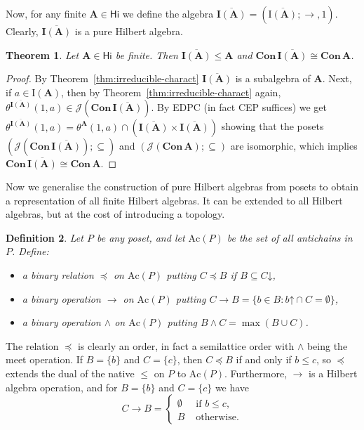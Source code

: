 \documentclass{amsart}
\newtheorem{theorem}{Theorem}[section]
\newtheorem{defn}[theorem]{Definition}
\newcommand{\alg}[1]{\mathbf{#1}}
\newcommand{\var}[1]{\mathsf{#1}}
\newcommand{\ov}[1]{\overline{#1}}
\newcommand{\Con}[1]{\mathbf{Con}\, #1}
\newcommand{\J}[1]{\mathcal{J}(#1)}
\newcommand{\Irr}[1]{\mathbf{I}(#1)}
\newcommand{\irr}[1]{\mathrm{I}(#1)}
\def\ra{\rightarrow}
\def\up#1{{#1}\mathord{\uparrow}}
\def\dw#1{{#1}\mathord{\downarrow}}
\begin{document}
Now, for any finite $\alg{A}\in\var{Hi}$ we define the algebra
$\ov{\Irr{\alg{A}}} = (\ov{\irr{\alg{A}}}; \ra, 1)$. Clearly,
$\ov{\Irr{\alg{A}}}$ is a pure Hilbert algebra. 

\begin{theorem}\label{thm:repr-fin-Hi}
Let $\alg{A}\in\var{Hi}$ be finite. Then $\ov{\Irr{\alg{A}}}\leq \alg{A}$ and
$\Con{\ov{\Irr{\alg{A}}}} \cong \Con{\alg{A}}$. 
\end{theorem}

\begin{proof}
By Theorem~\ref{thm:irreducible-charact} $\ov{\Irr{\alg{A}}}$ is a 
subalgebra of $\alg{A}$. Next, if $a\in\irr{\alg{A}}$, then by 
Theorem~\ref{thm:irreducible-charact} again, 
$\theta^{\ov{\Irr{\alg{A}}}}(1,a) \in \J{\Con{\ov{\Irr{\alg{A}}}}}$. By EDPC
(in fact CEP suffices) we get $\theta^{\ov{\Irr{\alg{A}}}}(1,a) =
\theta^{\alg{A}}(1,a)\cap (\ov{\Irr{\alg{A}}}\times\ov{\Irr{\alg{A}}})$  
showing that the posets $(\J{\Con{\ov{\Irr{\alg{A}}}}}; \subseteq)$ and
$(\J{\Con{\alg{A}}}; \subseteq)$ are isomorphic,
which implies $\Con{\ov{\Irr{\alg{A}}}} \cong
\Con{\alg{A}}$.
\end{proof}  



Now we generalise the construction of pure Hilbert algebras from posets
to obtain a representation of all finite Hilbert algebras. It can be extended to
all Hilbert algebras, but at the cost of introducing a topology.


\begin{defn}\label{def:ant-order}
Let $P$ be any poset, and let $\mathrm{Ac}(P)$ be the set of all
antichains in $P$. Define:
\begin{itemize}
\item a binary relation $\preccurlyeq$ on $\mathrm{Ac}(P)$ putting
$C\preccurlyeq B$ if $B\subseteq \dw{C}$,
\item a binary operation $\ra$ on $\mathrm{Ac}(P)$ putting 
$C\ra B = \{b \in B: \up{b}\cap C = \emptyset\}$,
\item a binary operation $\wedge$ on $\mathrm{Ac}(P)$ putting 
  $B\wedge C = \max(B\cup C)$.
\end{itemize}  
\end{defn}

The relation $\preccurlyeq$ is clearly an order, in fact a semilattice order with
$\wedge$ being the meet operation. If $B =\{b\}$ and $C=\{c\}$, then
$C\preccurlyeq B$ if and only if $b\leq c$, so $\preccurlyeq$ extends the dual of
the native $\leq$ on $P$ to $\mathrm{Ac}(P)$.
Furthermore, $\ra$ is a Hilbert algebra operation, and for
$B =\{b\}$ and $C=\{c\}$ we have
$$
C\ra B =\begin{cases}
  \emptyset & \text{ if }b\leq c,\\ 
  B & \text{ otherwise.}
\end{cases}
$$
\end{document}
